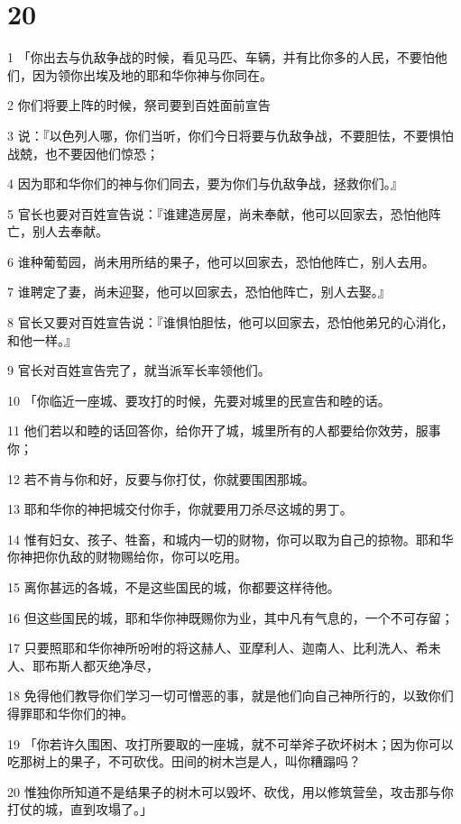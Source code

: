 \chapter{20}

\par 1 「你出去与仇敌争战的时候，看见马匹、车辆，并有比你多的人民，不要怕他们，因为领你出埃及地的耶和华你神与你同在。
\par 2 你们将要上阵的时候，祭司要到百姓面前宣告
\par 3 说：『以色列人哪，你们当听，你们今日将要与仇敌争战，不要胆怯，不要惧怕战兢，也不要因他们惊恐；
\par 4 因为耶和华你们的神与你们同去，要为你们与仇敌争战，拯救你们。』
\par 5 官长也要对百姓宣告说：『谁建造房屋，尚未奉献，他可以回家去，恐怕他阵亡，别人去奉献。
\par 6 谁种葡萄园，尚未用所结的果子，他可以回家去，恐怕他阵亡，别人去用。
\par 7 谁聘定了妻，尚未迎娶，他可以回家去，恐怕他阵亡，别人去娶。』
\par 8 官长又要对百姓宣告说：『谁惧怕胆怯，他可以回家去，恐怕他弟兄的心消化，和他一样。』
\par 9 官长对百姓宣告完了，就当派军长率领他们。
\par 10 「你临近一座城、要攻打的时候，先要对城里的民宣告和睦的话。
\par 11 他们若以和睦的话回答你，给你开了城，城里所有的人都要给你效劳，服事你；
\par 12 若不肯与你和好，反要与你打仗，你就要围困那城。
\par 13 耶和华你的神把城交付你手，你就要用刀杀尽这城的男丁。
\par 14 惟有妇女、孩子、牲畜，和城内一切的财物，你可以取为自己的掠物。耶和华你神把你仇敌的财物赐给你，你可以吃用。
\par 15 离你甚远的各城，不是这些国民的城，你都要这样待他。
\par 16 但这些国民的城，耶和华你神既赐你为业，其中凡有气息的，一个不可存留；
\par 17 只要照耶和华你神所吩咐的将这赫人、亚摩利人、迦南人、比利洗人、希未人、耶布斯人都灭绝净尽，
\par 18 免得他们教导你们学习一切可憎恶的事，就是他们向自己神所行的，以致你们得罪耶和华你们的神。
\par 19 「你若许久围困、攻打所要取的一座城，就不可举斧子砍坏树木；因为你可以吃那树上的果子，不可砍伐。田间的树木岂是人，叫你糟蹋吗？
\par 20 惟独你所知道不是结果子的树木可以毁坏、砍伐，用以修筑营垒，攻击那与你打仗的城，直到攻塌了。」

